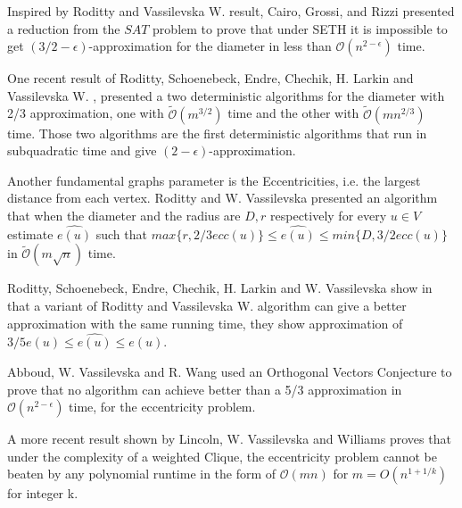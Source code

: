 Inspired by Roditty and Vassilevska W. \cite{LV2013} result, Cairo, Grossi, and Rizzi \cite{CGR16} presented a reduction from the $SAT$ problem to prove that under SETH it is impossible to get $(3/2-\epsilon)$-approximation for the diameter in less than $\mathcal{O}(n^{2-\epsilon})$ time.

One recent result of Roditty, Schoenebeck, Endre, Chechik, H. Larkin and Vassilevska W.
\cite{SDLLGREV2000}, presented a two deterministic algorithms for the diameter with 2/3 approximation, one with $\mathcal{\tilde{O}}(m^{3/2})$ time and the other with $\mathcal{\tilde{O}}(mn^{2/3})$ time.
Those two algorithms are the first deterministic algorithms that run in subquadratic time and give $(2-\epsilon)$-approximation.






Another fundamental graphs parameter is the Eccentricities, i.e. the largest distance from each vertex. 
Roditty and W. Vassilevska \cite{LV2013} presented an algorithm that when the diameter and the radius are $D,r$ respectively for every $u \in V$ estimate $\hat{e(u)}$ such that $max\{r,2/3ecc(u)\} \leq \hat{e(u)} \leq min\{D,3/2ecc(u)\}$ in $\mathcal{\tilde{O}}(m\sqrt{n})$ time.

Roditty, Schoenebeck, Endre, Chechik, H. Larkin and W. Vassilevska
show in \cite{SDLLGREV2000} that a variant of Roditty and Vassilevska W. algorithm \cite{LV2013} can give a better approximation with the same running time, they show approximation of $3/5e(u)\leq \hat{e(u)} \leq e(u)$.

Abboud, W. Vassilevska and R. Wang \cite{AVJ2016} used an Orthogonal Vectors Conjecture to prove that no algorithm can achieve better than a 5/3 approximation in $\mathcal{O}(n^{2-\epsilon})$ time, for the eccentricity problem.

A more recent result shown by Lincoln, W. Vassilevska and Williams \cite{AVR2018} proves that under the complexity of a weighted Clique, the eccentricity problem cannot be beaten by any polynomial runtime in the form of $\mathcal{O}(mn)$
for $m=O(n^{1+1/k})$ for integer k.


